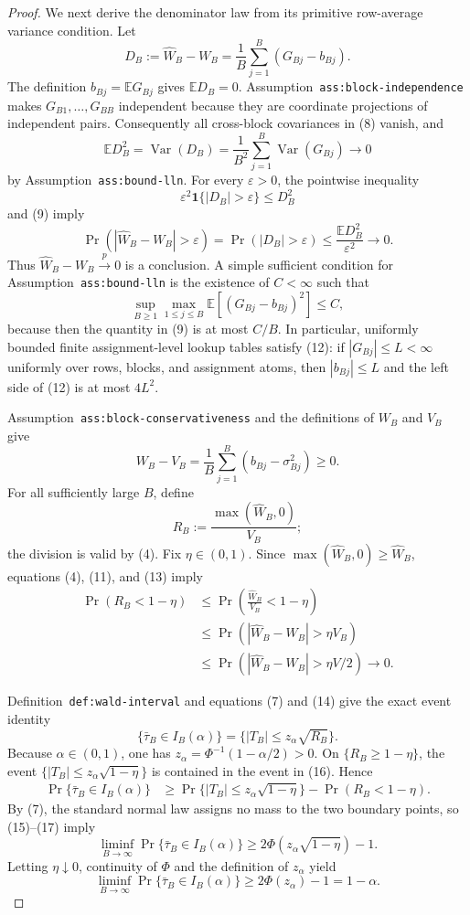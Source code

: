 \documentclass{article}
\begin{document}
\begin{proof}
We next derive the denominator law from its primitive row-average variance condition. Let
\[
D_B:=\widehat W_B-W_B
=\frac1B\sum_{j=1}^B(G_{Bj}-b_{Bj}).
\tag{8}
\]
The definition \(b_{Bj}=\mathbb E G_{Bj}\) gives \(\mathbb E D_B=0\). Assumption~\texttt{ass:block-independence} makes \(G_{B1},\ldots,G_{BB}\) independent because they are coordinate projections of independent pairs. Consequently all cross-block covariances in (8) vanish, and
\[
\mathbb E D_B^2
=\operatorname{Var}(D_B)
=\frac1{B^2}\sum_{j=1}^B\operatorname{Var}(G_{Bj})
\longrightarrow0
\tag{9}
\]
by Assumption~\texttt{ass:bound-lln}. For every \(\varepsilon>0\), the pointwise inequality
\[
\varepsilon^2\mathbf 1\{|D_B|>\varepsilon\}\le D_B^2
\tag{10}
\]
and (9) imply
\[
\Pr(|\widehat W_B-W_B|>\varepsilon)
=\Pr(|D_B|>\varepsilon)
\le \frac{\mathbb E D_B^2}{\varepsilon^2}
\longrightarrow0.
\tag{11}
\]
Thus \(\widehat W_B-W_B\xrightarrow{p}0\) is a conclusion. A simple sufficient condition for Assumption~\texttt{ass:bound-lln} is the existence of \(C<\infty\) such that
\[
\sup_{B\ge1}\max_{1\le j\le B}
\mathbb E[(G_{Bj}-b_{Bj})^2]\le C,
\tag{12}
\]
because then the quantity in (9) is at most \(C/B\). In particular, uniformly bounded finite assignment-level lookup tables satisfy (12): if \(|G_{Bj}|\le L<\infty\) uniformly over rows, blocks, and assignment atoms, then \(|b_{Bj}|\le L\) and the left side of (12) is at most \(4L^2\).

Assumption~\texttt{ass:block-conservativeness} and the definitions of \(W_B\) and \(V_B\) give
\[
W_B-V_B
=\frac1B\sum_{j=1}^B(b_{Bj}-\sigma_{Bj}^2)\ge0.
\tag{13}
\]
For all sufficiently large \(B\), define
\[
R_B:=\frac{\max(\widehat W_B,0)}{V_B};
\tag{14}
\]
the division is valid by (4). Fix \(\eta\in(0,1)\). Since \(\max(\widehat W_B,0)\ge\widehat W_B\), equations (4), (11), and (13) imply
\[
\begin{aligned}
\Pr(R_B<1-\eta)
&\le \Pr\!\left(\frac{\widehat W_B}{V_B}<1-\eta\right)\\
&\le \Pr\!\left(|\widehat W_B-W_B|>\eta V_B\right)\\
&\le \Pr\!\left(|\widehat W_B-W_B|>\eta V/2\right)
\longrightarrow0.
\end{aligned}
\tag{15}
\]

Definition~\texttt{def:wald-interval} and equations (7) and (14) give the exact event identity
\[
\{\bar\tau_B\in I_B(\alpha)\}
=\{|T_B|\le z_\alpha\sqrt{R_B}\}.
\tag{16}
\]
Because \(\alpha\in(0,1)\), one has \(z_\alpha=\Phi^{-1}(1-\alpha/2)>0\). On \(\{R_B\ge1-\eta\}\), the event \(\{|T_B|\le z_\alpha\sqrt{1-\eta}\}\) is contained in the event in (16). Hence
\[
\begin{aligned}
\Pr\{\bar\tau_B\in I_B(\alpha)\}
&\ge
\Pr\{|T_B|\le z_\alpha\sqrt{1-\eta}\}
-\Pr(R_B<1-\eta).
\end{aligned}
\tag{17}
\]
By (7), the standard normal law assigns no mass to the two boundary points, so (15)--(17) imply
\[
\liminf_{B\to\infty}\Pr\{\bar\tau_B\in I_B(\alpha)\}
\ge2\Phi\!\left(z_\alpha\sqrt{1-\eta}\right)-1.
\tag{18}
\]
Letting \(\eta\downarrow0\), continuity of \(\Phi\) and the definition of \(z_\alpha\) yield
\[
\liminf_{B\to\infty}\Pr\{\bar\tau_B\in I_B(\alpha)\}
\ge2\Phi(z_\alpha)-1=1-\alpha.
\tag{19}
\]


\end{proof}
\end{document}
